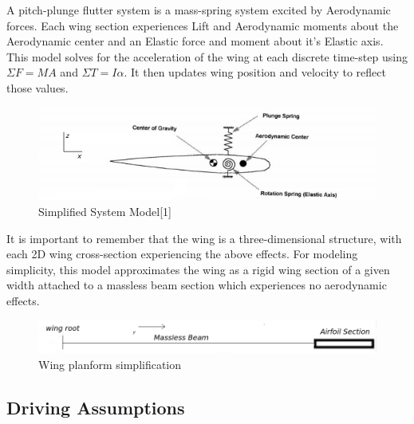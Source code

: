 \documentclass[]{article}
\begin{document}
A pitch-plunge flutter system is a mass-spring system excited by Aerodynamic forces. Each wing section experiences Lift and Aerodynamic moments about the Aerodynamic center and an Elastic force and moment about it's Elastic axis. 
This model solves for the acceleration of the wing at each discrete time-step using $\Sigma F = MA$ and $\Sigma T = I \alpha$. It then updates wing position and velocity to reflect those values. 


\begin{figure}[H]
	\includegraphics[width=12cm]{MassSpring}
	\centering
	\caption{Simplified System Model[1]}
\end{figure}

It is important to remember that the wing is a three-dimensional structure, with each 2D wing cross-section experiencing the above effects. For modeling simplicity, this model approximates the wing as a rigid wing section of a given width attached to a massless beam section which experiences no aerodynamic effects. 


\begin{figure}[H]
	\includegraphics[width=12cm]{ds}
	\centering
	\caption{Wing planform simplification}
\end{figure}

\subsection{Driving Assumptions}
\end{document}
